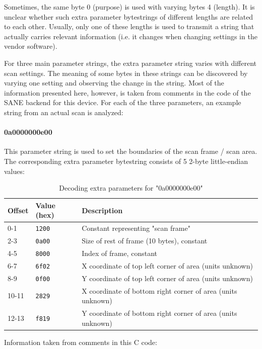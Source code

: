 \documentclass{article}
\begin{document}
Sometimes, the same byte 0 (purpose) is used with varying bytes 4 (length).
It is unclear whether such extra parameter bytestrings of different lengths
are related to each other. Usually, only one of these lengths is used to transmit
a string that actually carries relevant information (i.e. it changes when
changing settings in the vendor software).

For three main parameter strings, the extra parameter string varies
with different scan settings. The meaning of some bytes in these strings
can be discovered by varying one setting and observing the change in the
string. Most of the information presented here, however,
is taken from comments in the code of the SANE backend for this device.
For each of the three parameters, an example string from an actual
scan is analyzed:

\paragraph{0a0000000e00}

This parameter string is used to set the boundaries of the scan
frame / scan area. The corresponding extra parameter bytestring
consists of 5 2-byte little-endian values:

\begin{table}[H]
  \caption{Decoding extra parameters for "0a0000000e00"}
  \centering
  \begin{tabular}{p{1cm} | p{1cm} | p{7cm}}
    Offset & Value (hex) & Description \\ \hline
    0-1 & {\tt 1200} & Constant representing "scan frame" \\
    2-3 & {\tt 0a00} & Size of rest of frame (10 bytes), constant \\
    4-5 & {\tt 8000} & Index of frame, constant \\
    6-7 & {\tt 6f02} & X coordinate of top left corner of area (units unknown) \\
    8-9 & {\tt 0f00} & Y coordinate of top left corner of area (units unknown) \\
    10-11 & {\tt 2829} & X coordinate of bottom right corner of area (units unknown) \\
    12-13 & {\tt f819} & Y coordinate of bottom right corner of area (units unknown) \\
  \end{tabular}
  
  \vspace{5mm}
  Information taken from comments in this C code: \cite[\texttt{pieusb\_scancmd.c}]{sane_code}
  \label{table:param0a}
\end{table}
\end{document}
